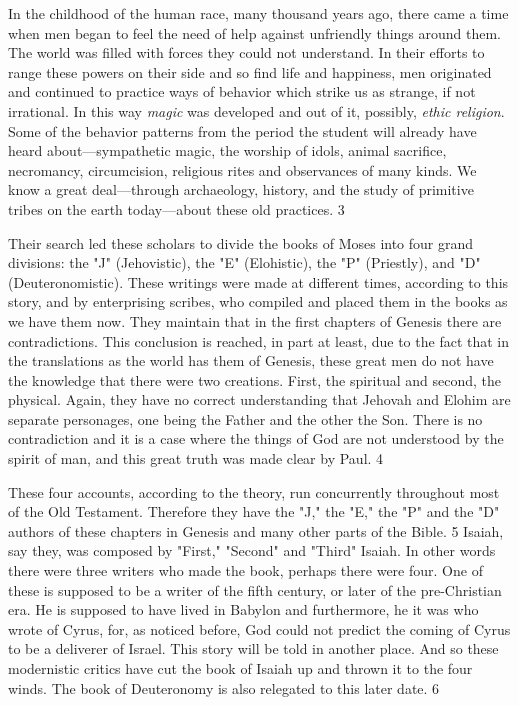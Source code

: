 In the childhood of the human race, many thousand years ago, there came a time when men
began to feel the need of help against unfriendly things around them. The world was filled
with forces they could not understand. In their efforts to range these powers on their side and
so find life and happiness, men originated and continued to practice ways of behavior which
strike us as strange, if not irrational. In this way \textit{magic} was developed and out of it, possibly,
\textit{ethic religion}. Some of the behavior patterns from the period the student will already have
heard about—sympathetic magic, the worship of idols, animal sacrifice, necromancy,
circumcision, religious rites and observances of many kinds. We know a great deal—through
archaeology, history, and the study of primitive tribes on the earth today—about these old
practices. 3

Their search led these scholars to divide the books of Moses into four grand divisions: the "J"
(Jehovistic), the "E" (Elohistic), the "P" (Priestly), and "D" (Deuteronomistic). These
writings were made at different times, according to this story, and by enterprising scribes,
who compiled and placed them in the books as we have them now. They maintain that in the
first chapters of Genesis there are contradictions. This conclusion is reached, in part at least,
due to the fact that in the translations as the world has them of Genesis, these great men do
not have the knowledge that there were two creations. First, the spiritual and second, the
physical. Again, they have no correct understanding that Jehovah and Elohim are separate
personages, one being the Father and the other the Son. There is no contradiction and it is a
case where the things of God are not understood by the spirit of man, and this great truth was
made clear by Paul. 4

These four accounts, according to the theory, run concurrently throughout most of the Old
Testament. Therefore they have the "J," the "E," the "P" and the "D" authors of these
chapters in Genesis and many other parts of the Bible. 5 Isaiah, say they, was composed by
"First," "Second" and "Third" Isaiah. In other words there were three writers who made the
book, perhaps there were four. One of these is supposed to be a writer of the fifth century, or
later of the pre-Christian era. He is supposed to have lived in Babylon and furthermore, he it
was who wrote of Cyrus, for, as noticed before, God could not predict the coming of Cyrus to
be a deliverer of Israel. This story will be told in another place. And so these modernistic
critics have cut the book of Isaiah up and thrown it to the four winds. The book of
Deuteronomy is also relegated to this later date. 6

